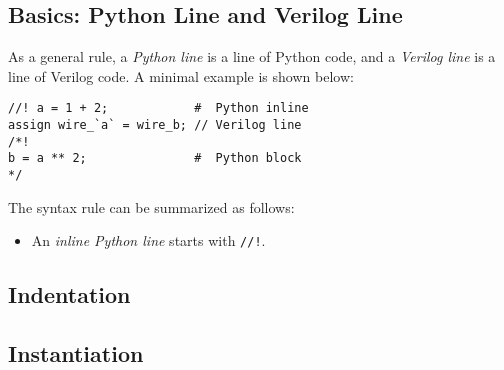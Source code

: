 \subsection{Basics: Python Line and Verilog Line}
As a general rule, a \textit{Python line} is a line of Python code,
and a \textit{Verilog line} is a line of Verilog code.
A minimal example is shown below:

\begin{verbatim}
//! a = 1 + 2;            #  Python inline
assign wire_`a` = wire_b; // Verilog line
/*!
b = a ** 2;               #  Python block
*/
\end{verbatim}

The syntax rule can be summarized as follows:
\begin{itemize}
  \item An \textit{inline Python line} starts with \texttt{//!}.
\end{itemize}


\subsection{Indentation}

\subsection{Instantiation}

